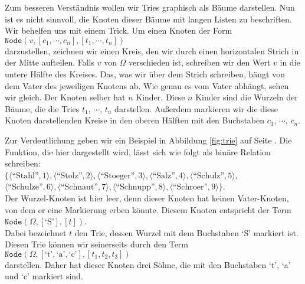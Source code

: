 Zum besseren Verst\"andnis wollen wir Tries graphisch als B\"aume darstellen.
Nun ist es nicht sinnvoll, die Knoten dieser B\"aume mit langen Listen zu beschriften.
Wir behelfen uns mit einem Trick.  Um einen Knoten der Form \\[0.2cm]
\hspace*{1.3cm} 
$\texttt{Node}(v, [c_1, \cdots, c_n], [t_1, \cdots, t_n])$ \\[0.2cm]
darzustellen, zeichnen wir einen Kreis,
den wir durch einen horizontalen Strich in der Mitte aufteilen.
Falls $v$ von $\Omega$ verschieden ist, schreiben wir den Wert $v$ in die untere H\"alfte
des Kreises.
Das, was wir \"uber dem Strich schreiben,
h\"angt von dem Vater des jeweiligen Knotens ab.  Wie genau es vom Vater abh\"angt, sehen wir gleich.
Der Knoten selber hat $n$ Kinder. Diese $n$ Kinder sind die 
Wurzeln der B\"aume, die die Tries $t_1$, $\cdots$, $t_n$ darstellen.
Au{\ss}erdem markieren wir die diese Knoten darstellenden Kreise in den oberen H\"alften 
mit den Buchstaben $c_1$, $\cdots$, $c_n$.  


Zur Verdeutlichung geben wir ein Beispiel in 
Abbildung \ref{fig:trie} auf Seite \pageref{fig:trie}.
Die Funktion, die hier dargestellt wird, l\"asst sich wie folgt als bin\"are Relation
schreiben: \\[0.2cm]
\hspace*{1.3cm} $ \bigl\{ \langle \textrm{``Stahl''},   1  \rangle, \langle \textrm{``Stolz''},     2  \rangle, \langle \textrm{``Stoeger''},   3  \rangle, 
             \langle \textrm{``Salz''},      4  \rangle, \langle \textrm{``Schulz''},    5  \rangle$, \\[0.2cm]
\hspace*{1.5cm} $\langle \textrm{``Schulze''},   6  \rangle, \langle \textrm{``Schnaut''},   7  \rangle, 
  \langle \textrm{``Schnupp''},   8  \rangle, 
  \langle \textrm{``Schroer''},   9  \rangle\}$. \\[0.2cm]
Der Wurzel-Knoten ist hier leer, denn dieser Knoten hat keinen Vater-Knoten, von dem er
eine Markierung erben k\"onnte.  Diesem Knoten entspricht der Term \\[0.2cm]
\hspace*{1.3cm} $\texttt{Node}(\Omega,[\textrm{`S'}], [t])$. \\[0.2cm]
Dabei bezeichnet $t$ den Trie, dessen Wurzel mit dem Buchstaben `S' markiert ist.
Diesen Trie k\"onnen wir seinerseits durch den Term \\[0.2cm]
\hspace*{1.3cm} 
$\texttt{Node}(\Omega,[\textrm{`t'},\textrm{`a'},\textrm{`c'}], [t_1, t_2, t_3])$ \\[0.2cm]
darstellen.  Daher hat dieser Knoten drei S\"ohne, die mit den Buchstaben `t', `a' und `c'
markiert sind.


